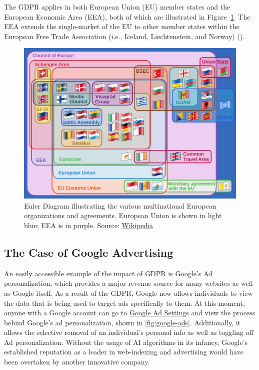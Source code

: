 \documentclass[
	letterpaper, %
]{jdf}
\begin{document}
The GDPR applies in both European Union (EU) member states and the European Economic Area (EEA), both of which are illustrated in Figure~\ref{fig:europe-groups}. The EEA extends the single-market of the EU to other member states within the European Free Trade Association (i.e., Iceland, Liechtenstein, and Norway) (\cite{efta}).
\begin{figure}[H]
	\centering
	\includegraphics[width=0.7\linewidth]{../figures/europe-groups}
	\caption{Euler Diagram illustrating the various multinational European organizations and agreements. European Union is shown in light blue; EEA is in purple. Source: \href{https://en.wikipedia.org/wiki/File:Supranational_European_Bodies-en.svg}{Wikipedia}
	}
	\label{fig:europe-groups}
\end{figure}



\subsection{The Case of Google Advertising}
An easily accessible example of the impact of GDPR is Google's Ad personalization, which provides a major revenue source for many websites as well as Google itself. As a result of the GDPR, Google now allows individuals to view the data that is being used to target ads specifically to them. At this moment, anyone with a Google account can go to \href{https://adssettings.google.com/}{Google Ad Settings} and view the process behind Google's ad personalization, shown in \ref{fig:google-ads}. Additionally, it allows the selective removal of an individual's personal info as well as toggling off Ad personalization. Without the usage of AI algorithms in its infancy, Google's established reputation as a leader in web-indexing and advertising would have been overtaken by another innovative company. 
\end{document}
